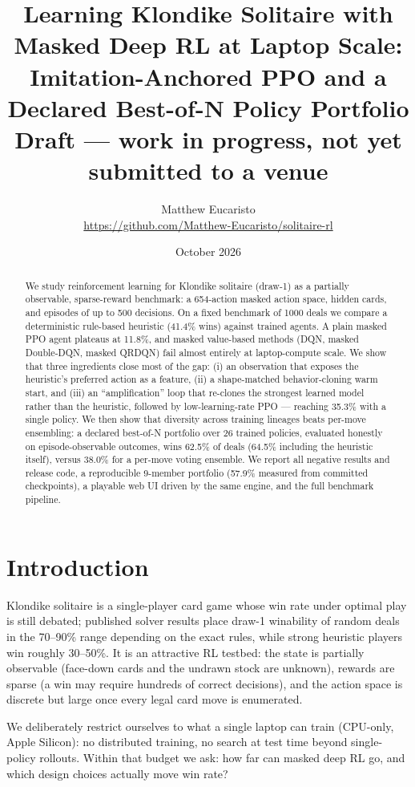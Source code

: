\documentclass[11pt]{article}
\title{Learning Klondike Solitaire with Masked Deep RL at Laptop Scale:\\
Imitation-Anchored PPO and a Declared Best-of-N Policy Portfolio\\
\large Draft — work in progress, not yet submitted to a venue}
\author{Matthew Eucaristo\\\small \url{https://github.com/Matthew-Eucaristo/solitaire-rl}}
\date{October 2026}
\begin{document}
\maketitle

\begin{abstract}
We study reinforcement learning for Klondike solitaire (draw-1) as a
partially observable, sparse-reward benchmark: a 654-action masked action
space, hidden cards, and episodes of up to 500 decisions. On a fixed
benchmark of 1000 deals we compare a deterministic rule-based heuristic
(41.4\% wins) against trained agents. A plain masked PPO agent plateaus at
11.8\%, and masked value-based methods (DQN, masked Double-DQN, masked
QRDQN) fail almost entirely at laptop-compute scale. We show that three
ingredients close most of the gap: (i) an observation that exposes the
heuristic's preferred action as a feature, (ii) a shape-matched
behavior-cloning warm start, and (iii) an ``amplification'' loop that
re-clones the strongest learned model rather than the heuristic, followed
by low-learning-rate PPO — reaching 35.3\% with a single policy. We then
show that diversity across training lineages beats per-move ensembling: a
declared best-of-N portfolio over 26 trained policies, evaluated honestly
on episode-observable outcomes, wins 62.5\% of deals (64.5\% including the
heuristic itself), versus 38.0\% for a per-move voting ensemble. We report
all negative results and release code, a reproducible 9-member portfolio
(57.9\% measured from committed checkpoints), a playable web UI driven by
the same engine, and the full benchmark pipeline.
\end{abstract}

\section{Introduction}
Klondike solitaire is a single-player card game whose win rate under
optimal play is still debated; published solver results place draw-1
winability of random deals in the 70--90\% range depending on the exact
rules, while strong heuristic players win roughly 30--50\%. It is an
attractive RL testbed: the state is partially observable (face-down cards
and the undrawn stock are unknown), rewards are sparse (a win may require
hundreds of correct decisions), and the action space is discrete but
large once every legal card move is enumerated.

We deliberately restrict ourselves to what a single laptop can train
(CPU-only, Apple Silicon): no distributed training, no search at test
time beyond single-policy rollouts. Within that budget we ask: how far
can masked deep RL go, and which design choices actually move win rate?
\end{document}
